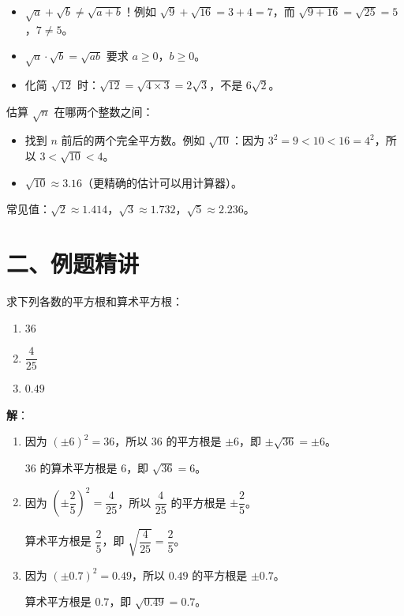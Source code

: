 \documentclass[12pt, a4paper]{ctexart}
\begin{document}
\begin{warnbox}[根式运算易错点]
\begin{itemize}[leftmargin=2em]
  \item $\sqrt{a} + \sqrt{b} \neq \sqrt{a+b}$！例如 $\sqrt{9} + \sqrt{16} = 3 + 4 = 7$，而 $\sqrt{9+16} = \sqrt{25} = 5$，$7 \neq 5$。
  \item $\sqrt{a} \cdot \sqrt{b} = \sqrt{ab}$ 要求 $a \geq 0$，$b \geq 0$。
  \item 化简 $\sqrt{12}$ 时：$\sqrt{12} = \sqrt{4 \times 3} = 2\sqrt{3}$，不是 $6\sqrt{2}$。
\end{itemize}
\end{warnbox}

\begin{tipbox}[估算无理数的大小]
估算 $\sqrt{n}$ 在哪两个整数之间：
\begin{itemize}[leftmargin=2em]
  \item 找到 $n$ 前后的两个完全平方数。例如 $\sqrt{10}$：因为 $3^2 = 9 < 10 < 16 = 4^2$，所以 $3 < \sqrt{10} < 4$。
  \item $\sqrt{10} \approx 3.16$（更精确的估计可以用计算器）。
\end{itemize}
常见值：$\sqrt{2} \approx 1.414$，$\sqrt{3} \approx 1.732$，$\sqrt{5} \approx 2.236$。
\end{tipbox}

\section*{\textcolor{examorange}{二、例题精讲}}

\begin{examplebox}[【例题1】求平方根与算术平方根]
求下列各数的平方根和算术平方根：
\begin{enumerate}[label=(\arabic*)]
  \item $36$
  \item $\dfrac{4}{25}$
  \item $0.49$
\end{enumerate}
\end{examplebox}

\textbf{解}：

\begin{enumerate}[label=(\arabic*)]
  \item 因为 $(\pm 6)^2 = 36$，所以 36 的平方根是 $\pm 6$，即 $\pm\sqrt{36} = \pm 6$。

  36 的算术平方根是 $6$，即 $\sqrt{36} = 6$。

  \item 因为 $\left(\pm\dfrac{2}{5}\right)^2 = \dfrac{4}{25}$，所以 $\dfrac{4}{25}$ 的平方根是 $\pm\dfrac{2}{5}$。

  算术平方根是 $\dfrac{2}{5}$，即 $\sqrt{\dfrac{4}{25}} = \dfrac{2}{5}$。

  \item 因为 $(\pm 0.7)^2 = 0.49$，所以 $0.49$ 的平方根是 $\pm 0.7$。

  算术平方根是 $0.7$，即 $\sqrt{0.49} = 0.7$。
\end{enumerate}
\end{document}
